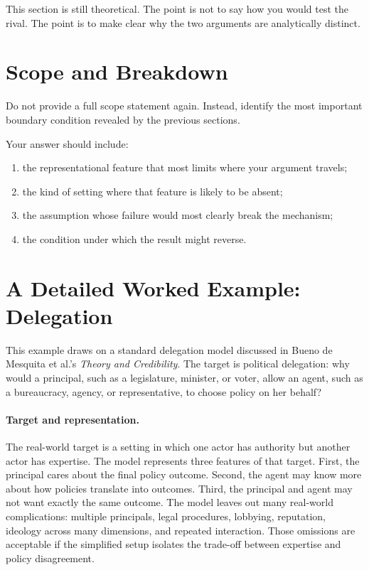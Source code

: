 \documentclass[12pt]{article}
\begin{document}
This section is still theoretical. The point is not to say how you would test the rival. The point is to make clear why the two arguments are analytically distinct.

\section{Scope and Breakdown}

Do not provide a full scope statement again. Instead, identify the most important boundary condition revealed by the previous sections.

Your answer should include:
\begin{enumerate}[label=(\alph*)]
\item the representational feature that most limits where your argument travels;
\item the kind of setting where that feature is likely to be absent;
\item the assumption whose failure would most clearly break the mechanism;
\item the condition under which the result might reverse.
\end{enumerate}

\section*{A Detailed Worked Example: Delegation}

This example draws on a standard delegation model discussed in Bueno de Mesquita et al.'s \emph{Theory and Credibility}. The target is political delegation: why would a principal, such as a legislature, minister, or voter, allow an agent, such as a bureaucracy, agency, or representative, to choose policy on her behalf?

\paragraph{Target and representation.}
The real-world target is a setting in which one actor has authority but another actor has expertise. The model represents three features of that target. First, the principal cares about the final policy outcome. Second, the agent may know more about how policies translate into outcomes. Third, the principal and agent may not want exactly the same outcome. The model leaves out many real-world complications: multiple principals, legal procedures, lobbying, reputation, ideology across many dimensions, and repeated interaction. Those omissions are acceptable if the simplified setup isolates the trade-off between expertise and policy disagreement.
\end{document}
